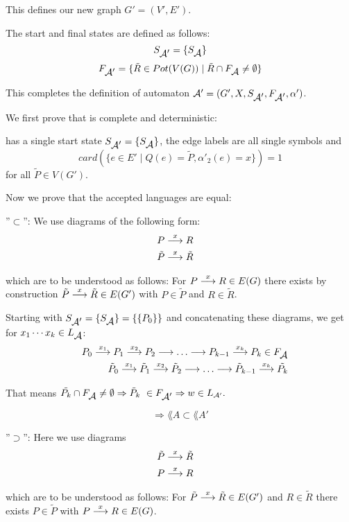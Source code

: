 This defines our new graph $G' = (V', E')$.

The start and final states are defined as follows:
\[ S_{\mbox{$\mathcal{A'}$}} = \{ S_{\mbox{$\mathcal{A}$}} \} \]
\[ F_{\mbox{$\mathcal{A'}$}} = \{ \tilde{R} \in Pot(V(G)) \mid \tilde{R} \cap
F_{\mbox{$\mathcal{A}$}} \neq \emptyset \} \]

This completes the definition of automaton $\mbox{$\mathcal{A'}$} = (G', X,
S_{\mbox{$\mathcal{A'}$}}, F_{\mbox{$\mathcal{A'}$}}, \alpha')$.

We first prove that
 is complete and deterministic:

 has a single start state $S_{\mbox{$\mathcal{A'}$}} = \{ S_{\mbox{$\mathcal{A}$}}
\}$, the edge labels are all single symbols and 
\[ card(\{ e \in E' \mid Q(e) = \tilde{P}, \alpha'_2(e) = x \}) = 1 \]
for all $\tilde{P} \in V(G')$.

Now we prove that the accepted languages are equal:

''$\subset$'': We use diagrams of the following form:
\begin{eqnarray*}
& P \stackrel{x}{\longrightarrow} R & \\
& \tilde{P} \stackrel{x}{\longrightarrow} \tilde{R} &
\end{eqnarray*}

which are to be understood as follows: For $P \stackrel{x}{\longrightarrow} R \in E(G)$
there exists by construction $\tilde{P} \stackrel{x}{\longrightarrow} \tilde{R} \in
E(G')$ with $P \in \tilde{P}$ and $R \in \tilde{R}$.

Starting with $S_{\mbox{$\mathcal{A'}$}} = \{ S_{\mbox{$\mathcal{A}$}} \} = \{ \{ P_0 \} \}$ and
concatenating these diagrams, we get for $x_1 \cdots x_k \in
L_{\mbox{$\mathcal{A}$}}$:
\begin{eqnarray*}
 & & P_0 \stackrel{x_1}{\longrightarrow} P_1 \stackrel{x_2}{\longrightarrow} P_2 \stackrel{}{\longrightarrow} \ldots \stackrel{}{\longrightarrow} P_{k-1} \stackrel{x_k}{\longrightarrow}
 P_k \in F_{\mbox{$\mathcal{A}$}} \\
 & & \tilde{P}_0 \stackrel{x_1}{\longrightarrow} \tilde{P}_1 \stackrel{x_2}{\longrightarrow} \tilde{P}_2 \stackrel{}{\longrightarrow} \ldots
 \stackrel{}{\longrightarrow} \tilde{P}_{k-1} \stackrel{x_k}{\longrightarrow} \tilde{P_k}
\end{eqnarray*}

That means $\tilde{P_k} \cap F_{\mbox{$\mathcal{A}$}} \neq \emptyset \Rightarrow \tilde{P}_k \
\in F_{\mbox{$\mathcal{A'}$}} \Rightarrow w \in \mbox{$L_{\mathcal{A'}}$}.$

\[ \Rightarrow \lang{A} \subset \lang{A'}\]

''$\supset$'': Here we use diagrams  
\begin{eqnarray*}
& \tilde{P} \stackrel{x}{\longrightarrow} \tilde{R} & \\
& P \stackrel{x}{\longrightarrow} R & 
\end{eqnarray*}

which are to be understood as follows: For $\tilde{P} \stackrel{x}{\longrightarrow} \tilde{R} \in
E(G')$ and $R \in \tilde{R}$ there exists $P \in \tilde{P}$ with $P \stackrel{x}{\longrightarrow} R
\in E(G)$.

